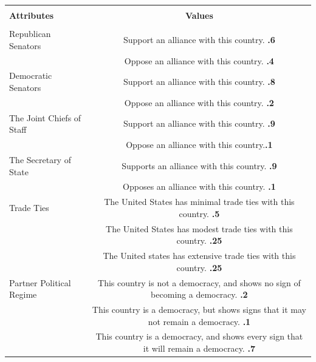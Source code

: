 \documentclass[12pt]{article}
\begin{document}
\begin{table}
\begin{adjustbox}{width = .99\textwidth}
\begin{tabular}{lc} 
\hline \\ 
\textbf{Attributes} & \textbf{Values} \\
\hline \\ 
Republican Senators & Support an alliance with this country. \textbf{.6} \\
                    & Oppose an alliance with this country. \textbf{.4} \\ 
                    
Democratic Senators & Support an alliance with this country. \textbf{.8} \\
                    & Oppose an alliance with this country. \textbf{.2}\\ 
                    
The Joint Chiefs of Staff & Support an alliance with this country. \textbf{.9}\\
                    & Oppose an alliance with this country.\textbf{.1}  \\ 
                    
The Secretary of State & Supports an alliance with this country. \textbf{.9} \\
                    & Opposes an alliance with this country. \textbf{.1} \\ 
Trade Ties          & The United States has minimal trade ties with this country. \textbf{.5} \\
                    & The United States has modest trade ties with this country. \textbf{.25}\\
                    & The United states has extensive trade ties with this country. \textbf{.25} \\ 
Partner Political Regime    & This country is not a democracy, and shows no sign of becoming a democracy. \textbf{.2}\\
                    & This country is a democracy, but shows signs that it may not remain a democracy. \textbf{.1} \\ %
                    & This country is a democracy, and shows every sign that it will remain a democracy. \textbf{.7}\\
                    

\end{tabular}
\end{adjustbox}
\end{table}
\end{document}
